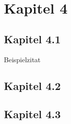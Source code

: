 \section{Kapitel 4}
\subsection{Kapitel 4.1}
Beispielzitat

\subsection{Kapitel 4.2}

\subsection{Kapitel 4.3}
\newpage